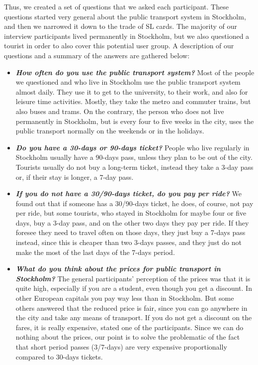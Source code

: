 \documentclass[11pt,twoside,a4paper]{report}
\begin{document}
Thus, we created a set of questions that we asked each participant. These questions started very general about the public transport system in Stockholm, and then we narrowed it down to the trade of SL cards. The majority of our interview participants lived permanently in Stockholm, but we also questioned a tourist in order to also cover this potential user group. A description of our questions and a summary of the answers are gathered below:

\begin{itemize}
\item \textbf{\textit{How often do you use the public transport system?}} Most of the people we questioned and who live in Stockholm use the public transport system almost daily. They use it to get to the university, to their work, and also for leisure time activities. Mostly, they take the metro and commuter trains, but also buses and trams. On the contrary, the person who does not live permanently in Stockholm, but is every four to five weeks in the city, uses the public transport normally on the weekends or in the holidays.
\item \textbf{\textit{Do you have a 30-days or 90-days ticket?}} People who live regularly in Stockholm usually have a 90-days pass, unless they plan to be out of the city. Tourists usually do not buy a long-term ticket, instead they take a 3-day pass or, if their stay is longer, a 7-day pass.
\item \textbf{\textit{If you do not have a 30/90-days ticket, do you pay per ride?}} We found out that if someone has a 30/90-days ticket, he does, of course, not pay per ride, but some tourists, who stayed in Stockholm for maybe four or five days, buy a 3-day pass, and on the other two days they pay per ride. If they foresee they need to travel often on those days, they just buy a 7-days pass instead, since this is cheaper than two 3-days passes, and they just do not make the most of the last days of the 7-days period.
\item \textbf{\textit{What do you think about the prices for public transport in Stockholm?}} The general participants' perception of the prices was that it is quite high, especially if you are a student, even though you get a discount. In other European capitals you pay way less than in Stockholm. But some others answered that the reduced price is fair, since you can go anywhere in the city and take any means of transport. If you do not get a discount on the fares, it is really expensive, stated one of the participants. Since we can do nothing about the prices, our point is to solve the problematic of the fact that short period passes (3/7-days) are very expensive proportionally compared to 30-days tickets.

\end{itemize}
\end{document}
